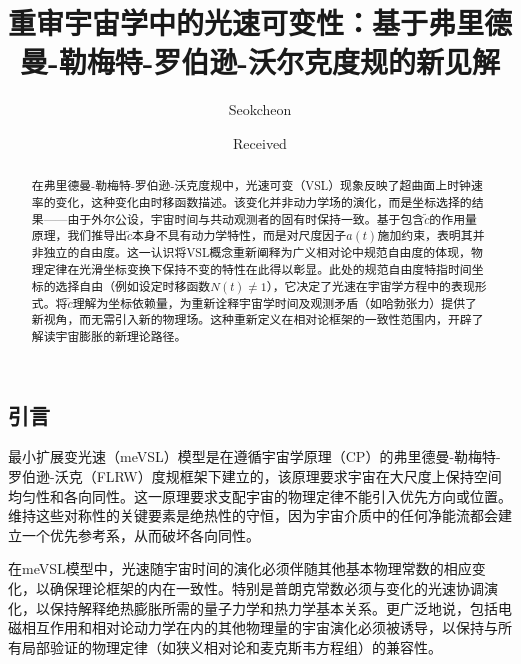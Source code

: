 \documentclass[jkps,preprint,fleqn]{revtex4}
\newcommand{\tc}{\tilde{c}}
\begin{document}
\begin{CJK*}{UTF8}{gbsn}
\setcounter{page}{0}

\title[]{重审宇宙学中的光速可变性：基于弗里德曼-勒梅特-罗伯逊-沃尔克度规的新见解}
\author{Seokcheon }

\date[]{Received }

\begin{abstract}
在弗里德曼-勒梅特-罗伯逊-沃克度规中，光速可变（VSL）现象反映了超曲面上时钟速率的变化，这种变化由时移函数描述。该变化并非动力学场的演化，而是坐标选择的结果——由于外尔公设，宇宙时间与共动观测者的固有时保持一致。基于包含$\tc$的作用量原理，我们推导出$\tc$本身不具有动力学特性，而是对尺度因子$a(t)$施加约束，表明其并非独立的自由度。这一认识将VSL概念重新阐释为广义相对论中规范自由度的体现，物理定律在光滑坐标变换下保持不变的特性在此得以彰显。此处的规范自由度特指时间坐标的选择自由（例如设定时移函数$N(t) \neq 1$），它决定了光速在宇宙学方程中的表现形式。将$\tc$理解为坐标依赖量，为重新诠释宇宙学时间及观测矛盾（如哈勃张力）提供了新视角，而无需引入新的物理场。这种重新定义在相对论框架的一致性范围内，开辟了解读宇宙膨胀的新理论路径。
\end{abstract}

\maketitle

\tableofcontents
\section{引言}
\label{sec:intro}

最小扩展变光速（meVSL）模型是在遵循宇宙学原理（CP）的弗里德曼-勒梅特-罗伯逊-沃克（FLRW）度规框架下建立的，该原理要求宇宙在大尺度上保持空间均匀性和各向同性\cite{Lee:2020zts,Lee:2023bjz,Lee:2024mal}。这一原理要求支配宇宙的物理定律不能引入优先方向或位置。维持这些对称性的关键要素是绝热性的守恒，因为宇宙介质中的任何净能流都会建立一个优先参考系，从而破坏各向同性\cite{Lee:2022heb}。

在meVSL模型中，光速随宇宙时间的演化必须伴随其他基本物理常数的相应变化，以确保理论框架的内在一致性。特别是普朗克常数必须与变化的光速协调演化，以保持解释绝热膨胀所需的量子力学和热力学基本关系\cite{Lee:2022heb}。更广泛地说，包括电磁相互作用和相对论动力学在内的其他物理量的宇宙演化必须被诱导，以保持与所有局部验证的物理定律（如狭义相对论和麦克斯韦方程组）的兼容性\cite{Lee:2020zts,Lee:2023bjz,Lee:2024mal,Lee:2022heb}。


\end{CJK*}
\end{document}
